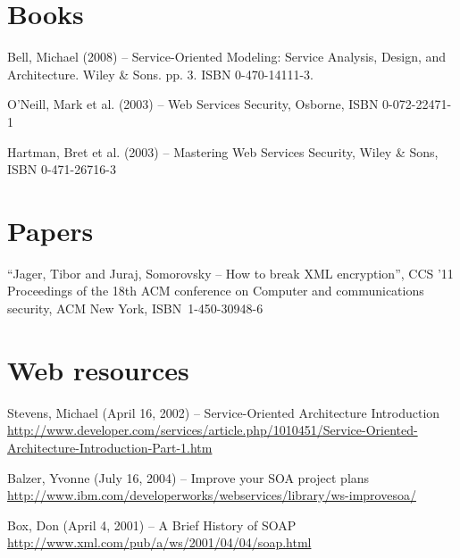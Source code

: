 

%
%

%
%


\begin{thebibliography}{99}

\section*{Books}

Bell, Michael (2008) -- Service-Oriented Modeling: Service Analysis, Design, and Architecture. Wiley & Sons. pp. 3. ISBN 0-470-14111-3.

O'Neill, Mark et al. (2003) -- Web Services Security, Osborne, ISBN 0-072-22471-1

Hartman, Bret et al. (2003) -- Mastering Web Services Security, Wiley \& Sons, ISBN 0-471-26716-3

\section*{Papers}

``Jager, Tibor and Juraj, Somorovsky -- How to break XML encryption'',
CCS '11 Proceedings of the 18th ACM conference on Computer and communications security,
ACM New York, \mbox{ISBN 1-450-30948-6}

\section*{Web resources}

Stevens, Michael (April 16, 2002) -- Service-Oriented Architecture Introduction
\url{http://www.developer.com/services/article.php/1010451/Service-Oriented-Architecture-Introduction-Part-1.htm}

Balzer, Yvonne (July 16, 2004) -- Improve your SOA project plans\\
\url{http://www.ibm.com/developerworks/webservices/library/ws-improvesoa/}

Box, Don (April 4, 2001) -- A Brief History of SOAP\\
\url{http://www.xml.com/pub/a/ws/2001/04/04/soap.html}



\end{thebibliography}
